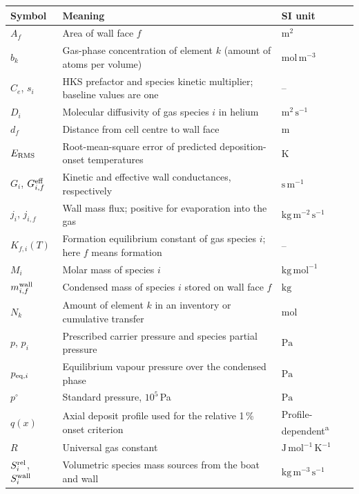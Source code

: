 \documentclass[10pt,a4paper]{article}
\begin{document}
{\small
\renewcommand{\arraystretch}{1.15}
\begin{tabularx}{\textwidth}{@{}p{2.2cm}>{\raggedright\arraybackslash}X>{\raggedright\arraybackslash}p{2.6cm}@{}}
\toprule
\textbf{Symbol} & \textbf{Meaning} & \textbf{SI unit} \\
\midrule
$A_f$ & Area of wall face $f$ & $\mathrm{m^2}$ \\
$b_k$ & Gas-phase concentration of element $k$ (amount of atoms per volume) & $\mathrm{mol\,m^{-3}}$ \\
$C_e$, $s_i$ & HKS prefactor and species kinetic multiplier; baseline values are one & -- \\
$D_i$ & Molecular diffusivity of gas species $i$ in helium & $\mathrm{m^2\,s^{-1}}$ \\
$d_f$ & Distance from cell centre to wall face & $\mathrm{m}$ \\
$E_{\rm RMS}$ & Root-mean-square error of predicted deposition-onset temperatures & $\mathrm{K}$ \\
$G_i$, $G_{i,f}^{\rm eff}$ & Kinetic and effective wall conductances, respectively & $\mathrm{s\,m^{-1}}$ \\
$j_i$, $j_{i,f}$ & Wall mass flux; positive for evaporation into the gas & $\mathrm{kg\,m^{-2}\,s^{-1}}$ \\
$K_{f,i}(T)$ & Formation equilibrium constant of gas species $i$; here $f$ means formation & -- \\
$M_i$ & Molar mass of species $i$ & $\mathrm{kg\,mol^{-1}}$ \\
$m_{i,f}^{\rm wall}$ & Condensed mass of species $i$ stored on wall face $f$ & $\mathrm{kg}$ \\
$N_k$ & Amount of element $k$ in an inventory or cumulative transfer & $\mathrm{mol}$ \\
$p$, $p_i$ & Prescribed carrier pressure and species partial pressure & $\mathrm{Pa}$ \\
$p_{{\rm eq},i}$ & Equilibrium vapour pressure over the condensed phase & $\mathrm{Pa}$ \\
$p^\circ$ & Standard pressure, $10^5$\,Pa & $\mathrm{Pa}$ \\
$q(x)$ & Axial deposit profile used for the relative 1\,\% onset criterion & Profile-dependent\textsuperscript{a} \\
$R$ & Universal gas constant & $\mathrm{J\,mol^{-1}\,K^{-1}}$ \\
$S_i^{\rm rel}$, $S_i^{\rm wall}$ & Volumetric species mass sources from the boat and wall & $\mathrm{kg\,m^{-3}\,s^{-1}}$ \\

\end{tabularx}}
\end{document}
